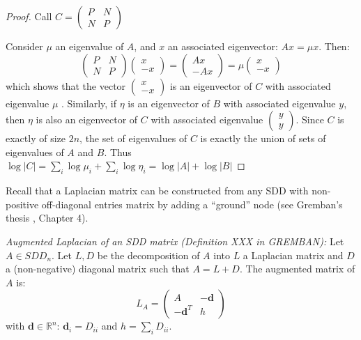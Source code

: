 \begin{proof} Call $C=\left(\begin{array}{cc}
P & N\\
N & P
\end{array}\right)$

Consider $\mu$ an eigenvalue of $A$, and $x$ an associated eigenvector:
$Ax=\mu x$. Then:
\[
\left(\begin{array}{cc}
P & N\\
N & P
\end{array}\right)\left(\begin{array}{c}
x\\
-x
\end{array}\right)=\left(\begin{array}{c}
Ax\\
-Ax
\end{array}\right)=\mu\left(\begin{array}{c}
x\\
-x
\end{array}\right)
\]
which shows that the vector $\left(\begin{array}{c}
x\\
-x
\end{array}\right)$ is an eigenvector of $C$ with associated eigenvalue $\mu$ . Similarly,
if $\eta$ is an eigenvector of $B$ with associated eigenvalue $y$,
then $\eta$ is also an eigenvector of $C$ with associated eigenvalue
$\left(\begin{array}{c}
y\\
y
\end{array}\right)$. Since $C$ is exactly of size $2n$, the set of eigenvalues of $C$
is exactly the union of sets of eigenvalues of $A$ and $B$. Thus
$\log\left|C\right|=\sum_{i}\log\mu_{i}+\sum_{i}\log\eta_{i}=\log\left|A\right|+\log\left|B\right|$

\end{proof}

Recall that a Laplacian matrix can be constructed from any SDD with
non-positive off-diagonal entries matrix by adding a ``ground''
node (see Gremban's thesis \cite{Gremban1996}, Chapter 4).

\begin{definition} \emph{Augmented Laplacian of an SDD matrix (Definition
XXX in GREMBAN):} Let $A\in SDD_{n}$. Let $L,D$ be the decomposition
of $A$ into $L$ a Laplacian matrix and $D$ a (non-negative) diagonal
matrix such that $A=L+D$. The augmented matrix of $A$ is: 
\[
L_{A}=\left(\begin{array}{cc}
A & -\mathbf{d}\\
-\mathbf{d}^{T} & h
\end{array}\right)
\]
with $\mathbf{d}\in\mathbb{R}^{n}$: $\mathbf{d}_{i}=D_{ii}$ and
$h=\sum_{i}D_{ii}$. \end{definition}

